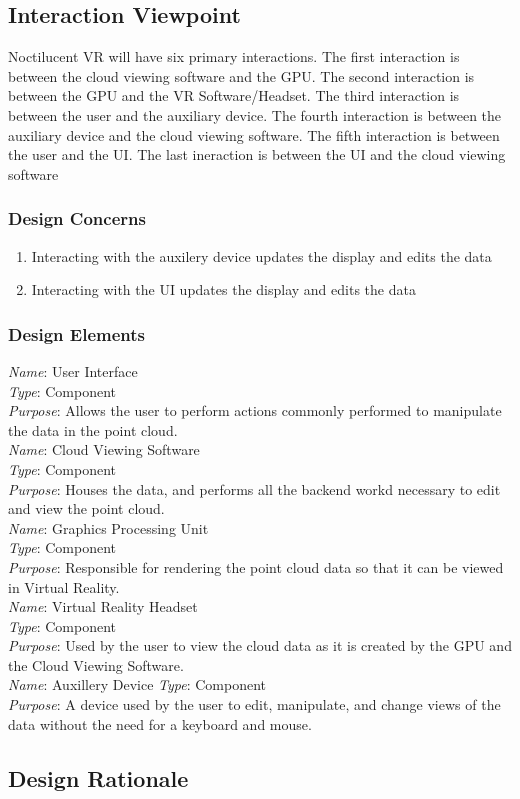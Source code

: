 \documentclass{article}
\begin{document}
\subsection{Interaction Viewpoint}

Noctilucent VR will have six primary interactions.
The first interaction is between the cloud viewing software and the GPU.
The second interaction is between the GPU and the VR Software/Headset.
The third interaction is between the user and the auxiliary device.
The fourth interaction is between the auxiliary device and the cloud viewing software.
The fifth interaction is between the user and the UI.
The last ineraction is between the UI and the cloud viewing software

\subsubsection{Design Concerns}

\begin{enumerate}
	\item Interacting with the auxilery device updates the display and edits the data
	\item Interacting with the UI updates the display and edits the data
\end{enumerate}

\subsubsection{Design Elements}

		\textit{Name}: User Interface\\
		\textit{Type}: Component\\
		\textit{Purpose}: Allows the user to perform actions commonly performed to manipulate the data in the point cloud.\\
\newline
		\textit{Name}: Cloud Viewing Software\\
		\textit{Type}: Component\\
		\textit{Purpose}: Houses the data, and performs all the backend workd necessary to edit and view the point cloud.\\
\newline
		\textit{Name}: Graphics Processing Unit\\
		\textit{Type}: Component\\
		\textit{Purpose}: Responsible for rendering the point cloud data so that it can be viewed in Virtual Reality.\\
\newline
		\textit{Name}: Virtual Reality Headset\\
		\textit{Type}: Component\\
		\textit{Purpose}: Used by the user to view the cloud data as it is created by the GPU and the Cloud Viewing Software.\\
\newline
		\textit{Name}: Auxillery Device
		\textit{Type}: Component\\
		\textit{Purpose}: A device used by the user to edit, manipulate, and change views of the data without the need for a keyboard and mouse.

\subsection{Design Rationale}
\end{document}
